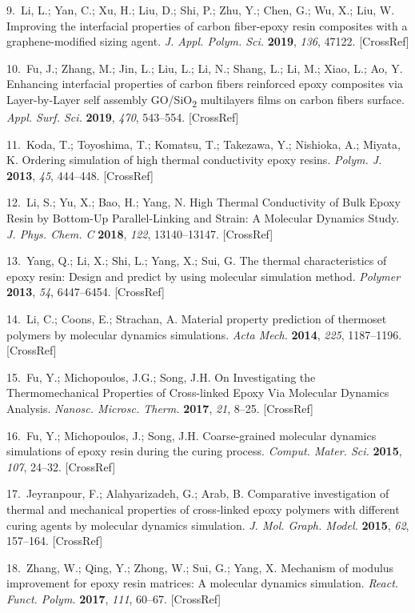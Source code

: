 \documentclass{article}
\begin{document}
\begin{hangpars}
9.\ Li, L.; Yan, C.; Xu, H.; Liu, D.; Shi, P.; Zhu, Y.; Chen, G.; Wu, X.; Liu, W. Improving the interfacial properties of carbon fiber-epoxy resin composites with a graphene-modified sizing agent. \emph{J. Appl. Polym. Sci.} \textbf{2019}, \emph{136}, 47122. [CrossRef]

10.\ Fu, J.; Zhang, M.; Jin, L.; Liu, L.; Li, N.; Shang, L.; Li, M.; Xiao, L.; Ao, Y. Enhancing interfacial properties of carbon fibers reinforced epoxy composites via Layer-by-Layer self assembly GO/SiO\textsubscript{2} multilayers films on carbon fibers surface. \emph{Appl. Surf. Sci.} \textbf{2019}, \emph{470}, 543–554. [CrossRef]

11.\ Koda, T.; Toyoshima, T.; Komatsu, T.; Takezawa, Y.; Nishioka, A.; Miyata, K. Ordering simulation of high thermal conductivity epoxy resins. \emph{Polym. J.} \textbf{2013}, \emph{45}, 444–448. [CrossRef]

12.\ Li, S.; Yu, X.; Bao, H.; Yang, N. High Thermal Conductivity of Bulk Epoxy Resin by Bottom-Up Parallel-Linking and Strain: A Molecular Dynamics Study. \emph{J. Phys. Chem. C} \textbf{2018}, \emph{122}, 13140–13147. [CrossRef]

13.\ Yang, Q.; Li, X.; Shi, L.; Yang, X.; Sui, G. The thermal characteristics of epoxy resin: Design and predict by using molecular simulation method. \emph{Polymer} \textbf{2013}, \emph{54}, 6447–6454. [CrossRef]

14.\ Li, C.; Coons, E.; Strachan, A. Material property prediction of thermoset polymers by molecular dynamics simulations. \emph{Acta Mech.} \textbf{2014}, \emph{225}, 1187–1196. [CrossRef]

15.\ Fu, Y.; Michopoulos, J.G.; Song, J.H. On Investigating the Thermomechanical Properties of Cross-linked Epoxy Via Molecular Dynamics Analysis. \emph{Nanosc. Microsc. Therm.} \textbf{2017}, \emph{21}, 8–25. [CrossRef]

16.\ Fu, Y.; Michopoulos, J.; Song, J.H. Coarse-grained molecular dynamics simulations of epoxy resin during the curing process. \emph{Comput. Mater. Sci.} \textbf{2015}, \emph{107}, 24–32. [CrossRef]

17.\ Jeyranpour, F.; Alahyarizadeh, G.; Arab, B. Comparative investigation of thermal and mechanical properties of cross-linked epoxy polymers with different curing agents by molecular dynamics simulation. \emph{J. Mol. Graph. Model.} \textbf{2015}, \emph{62}, 157–164. [CrossRef]

18.\ Zhang, W.; Qing, Y.; Zhong, W.; Sui, G.; Yang, X. Mechanism of modulus improvement for epoxy resin matrices: A molecular dynamics simulation. \emph{React. Funct. Polym.} \textbf{2017}, \emph{111}, 60–67. [CrossRef]


\end{hangpars}
\end{document}
